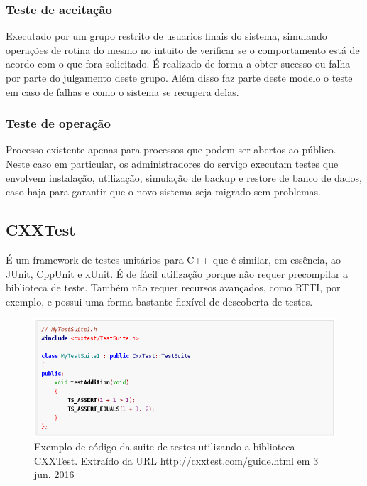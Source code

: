 \documentclass[
	article,			%
	12pt,				%
	oneside,			%
	a4paper,			%
	english,			
	brazil,
	sumario=tradicional
	]{abntex2}
\begin{document}
\subsubsection{Teste de aceitação}
Executado por um grupo restrito de usuarios finais do sistema, simulando operações de rotina do mesmo no intuito de verificar se o comportamento está de acordo com o que fora solicitado. É realizado de forma a obter sucesso ou falha por parte do julgamento deste grupo. Além disso faz parte deste modelo o teste em caso de falhas e como o sistema se recupera delas.

\subsubsection{Teste de operação}
Processo existente apenas para processos que podem ser abertos ao público. Neste caso em particular, os administradores do serviço executam testes que envolvem instalação, utilização, simulação de backup e restore de banco de dados, caso haja para garantir que o novo sistema seja migrado sem problemas.


\subsection{CXXTest}

É um framework de testes unitários para C++ que é similar, em essência, ao JUnit, CppUnit e xUnit. É de fácil utilização porque não requer precompilar a biblioteca de teste. Também não requer recursos avançados, como RTTI, por exemplo, e possui uma forma bastante flexível de descoberta de testes.


\begin{figure}[!h]
\centering
\includegraphics[scale=0.4]{images/cxxtest_simpletest.png}
\caption{Exemplo de código da suite de testes utilizando a biblioteca CXXTest. Extraído da URL http://cxxtest.com/guide.html em 3 jun. 2016}
\label{cxxtest_simpletest}
\end{figure}
\end{document}
